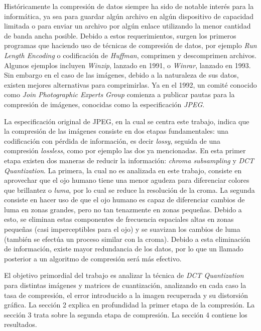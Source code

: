 \documentclass[%
	final,
	reprint,
	notitlepage,
	narroweqnarray,
	inline,
	twoside,
	invited
	]{ieee}
\begin{document}
\par Históricamente la compresión de datos siempre ha sido de notable interés para la informática,  
ya sea para guardar algún archivo en algún dispositivo de capacidad limitada o para enviar un 
archivo por algún enlace utilizando la menor cantidad de banda ancha posible.
 Debido a estos requerimientos, surgen los primeros programas que haciendo uso de técnicas de compresión de datos, 
 por ejemplo \textit{Run Length Encoding} o 
codificación de \textit{Huffman}, comprimen y descomprimen archivos. Algunos ejemplos incluyen 
\textit{Winzip}, lanzado en 1991, o \textit{Winrar}, lanzado en 1993. Sin embargo en el caso de las imágenes, 
debido a la naturaleza de sus datos, existen mejores alternativas para comprimirlas. Ya en el 1992, 
un comité conocido como \textit{Join Photographic Experts Group} comienza a publicar pautas 
para la compresión de imágenes, conocidas como la especificación \textit{JPEG}. 
\par La especificación original de JPEG, en la cual se centra este trabajo, indica que la compresión de las 
imágenes consiste en dos etapas fundamentales: una codificación con pérdida de información, es decir \textit{lossy}, 
seguida de una compresión \textit{lossless}, como por ejemplo las dos ya mencionadas. En esta primer etapa 
existen dos maneras de reducir la información: \textit{chroma subsampling} y \textit{DCT Quantization}. La primera, 
la cual no es analizada en este trabajo, consiste en aprovechar que el ojo humano tiene una menor agudeza 
para diferenciar colores que brillantez o \textit{luma}, por lo cual se reduce la resolución de la croma. La segunda 
consiste en hacer uso de que el ojo humano es capaz de diferenciar cambios de 
luma en zonas grandes, pero no tan tenazmente en zonas pequeñas. Debido a esto, se eliminan estas componentes 
de frecuencia espaciales altas en zonas pequeñas (casi imperceptibles para el ojo) y se suavizan los 
cambios de luma (también se efectúa un proceso similar con la croma). Debido a esta eliminación de información, 
existe mayor redundancia de los datos, por lo que un llamado posterior a un algoritmo de compresión será más 
efectivo.
\par El objetivo primordial del trabajo es analizar la técnica de \textit{DCT Quantization} para distintas 
imágenes y matrices de cuantización, analizando en cada caso la tasa de compresión, el error introducido a la 
imagen recuperada y su distorsión gráfica. La sección 2 explica en profundidad la primer etapa de la compresión. 
La sección 3 trata sobre la segunda etapa de compresión. La sección 4 contiene los resultados.
\end{document}
